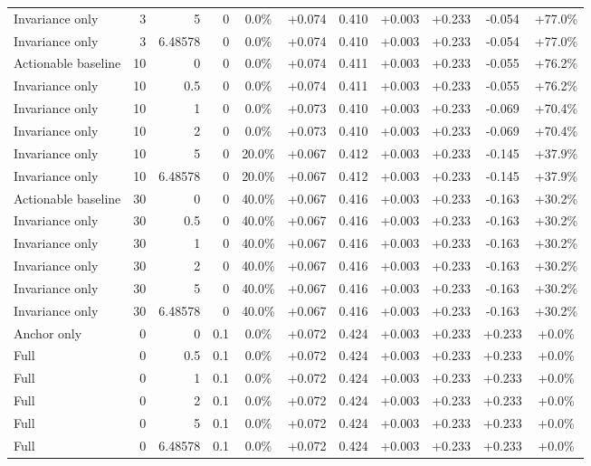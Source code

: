 \begin{table}[htbp]
\begin{tabular}{lrrrccccccc}
Invariance only & 3 & 5 & 0 & 0.0\% & +0.074 & 0.410 & +0.003 & +0.233 & -0.054 & +77.0\% \\
Invariance only & 3 & 6.48578 & 0 & 0.0\% & +0.074 & 0.410 & +0.003 & +0.233 & -0.054 & +77.0\% \\
Actionable baseline & 10 & 0 & 0 & 0.0\% & +0.074 & 0.411 & +0.003 & +0.233 & -0.055 & +76.2\% \\
Invariance only & 10 & 0.5 & 0 & 0.0\% & +0.074 & 0.411 & +0.003 & +0.233 & -0.055 & +76.2\% \\
Invariance only & 10 & 1 & 0 & 0.0\% & +0.073 & 0.410 & +0.003 & +0.233 & -0.069 & +70.4\% \\
Invariance only & 10 & 2 & 0 & 0.0\% & +0.073 & 0.410 & +0.003 & +0.233 & -0.069 & +70.4\% \\
Invariance only & 10 & 5 & 0 & 20.0\% & +0.067 & 0.412 & +0.003 & +0.233 & -0.145 & +37.9\% \\
Invariance only & 10 & 6.48578 & 0 & 20.0\% & +0.067 & 0.412 & +0.003 & +0.233 & -0.145 & +37.9\% \\
Actionable baseline & 30 & 0 & 0 & 40.0\% & +0.067 & 0.416 & +0.003 & +0.233 & -0.163 & +30.2\% \\
Invariance only & 30 & 0.5 & 0 & 40.0\% & +0.067 & 0.416 & +0.003 & +0.233 & -0.163 & +30.2\% \\
Invariance only & 30 & 1 & 0 & 40.0\% & +0.067 & 0.416 & +0.003 & +0.233 & -0.163 & +30.2\% \\
Invariance only & 30 & 2 & 0 & 40.0\% & +0.067 & 0.416 & +0.003 & +0.233 & -0.163 & +30.2\% \\
Invariance only & 30 & 5 & 0 & 40.0\% & +0.067 & 0.416 & +0.003 & +0.233 & -0.163 & +30.2\% \\
Invariance only & 30 & 6.48578 & 0 & 40.0\% & +0.067 & 0.416 & +0.003 & +0.233 & -0.163 & +30.2\% \\
Anchor only & 0 & 0 & 0.1 & 0.0\% & +0.072 & 0.424 & +0.003 & +0.233 & +0.233 & +0.0\% \\
Full & 0 & 0.5 & 0.1 & 0.0\% & +0.072 & 0.424 & +0.003 & +0.233 & +0.233 & +0.0\% \\
Full & 0 & 1 & 0.1 & 0.0\% & +0.072 & 0.424 & +0.003 & +0.233 & +0.233 & +0.0\% \\
Full & 0 & 2 & 0.1 & 0.0\% & +0.072 & 0.424 & +0.003 & +0.233 & +0.233 & +0.0\% \\
Full & 0 & 5 & 0.1 & 0.0\% & +0.072 & 0.424 & +0.003 & +0.233 & +0.233 & +0.0\% \\
Full & 0 & 6.48578 & 0.1 & 0.0\% & +0.072 & 0.424 & +0.003 & +0.233 & +0.233 & +0.0\% \\

\end{tabular}
\end{table}
